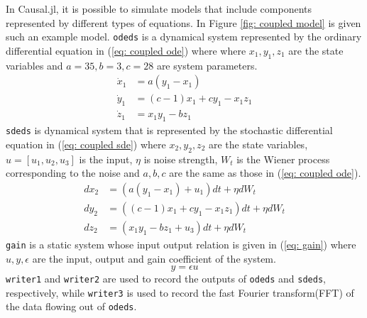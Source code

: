 \documentclass{juliacon}
\begin{document}
In Causal.jl, it is possible to simulate models that include components represented by different types of equations. In Figure \ref{fig: coupled model} is given such an example model. \texttt{odeds} is a dynamical system represented by the ordinary differential equation in (\ref{eq: coupled ode}) where where $x_1, y_1, z_1$ are the state variables and $a=35, b=3, c = 28$ are system parameters.
\begin{equation}
    \begin{split}
        \dot{x}_1 &= a (y_1 - x_1) \\
        \dot{y}_1 &= (c - 1) x_1 + c y_1 - x_1 z_1 \\
        \dot{z}_1 &= x_1 y_1 - b z_1
    \end{split}
    \label{eq: coupled ode}
\end{equation}
\texttt{sdeds} is dynamical system that is represented by the stochastic differential equation in (\ref{eq: coupled sde}) where $x_2, y_2, z_2$ are the state variables, $u=[u_1,u_2, u_3]$ is the input, $\eta$ is noise strength, $W_t$ is the Wiener process corresponding to the noise and $a, b, c$ are the same as those in (\ref{eq: coupled ode}).
\begin{equation}
    \begin{split}
        dx_2 &= (a (y_1 - x_1) + u_1) dt + \eta dW_t \\
        dy_2 &= ((c - 1) x_1 + c y_1 - x_1 z_1)dt + \eta dW_t \\
        dz_2 &= (x_1 y_1 - b z_1 + u_3) dt + \eta dW_t 
    \end{split}
    \label{eq: coupled sde}
\end{equation}
\texttt{gain} is a static system whose input output relation is given in (\ref{eq: gain}) where $u, y, \epsilon$ are the input, output and gain coefficient of the system. 
\begin{equation}
    y = \epsilon u
    \label{eq: gain}
\end{equation}
\texttt{writer1} and \texttt{writer2} are used to record the outputs of \texttt{odeds} and \texttt{sdeds}, respectively, while \texttt{writer3} is used to record the fast Fourier transform(FFT) of the data flowing out of \texttt{odeds}\cite{proakis2004digital}. 
\end{document}
